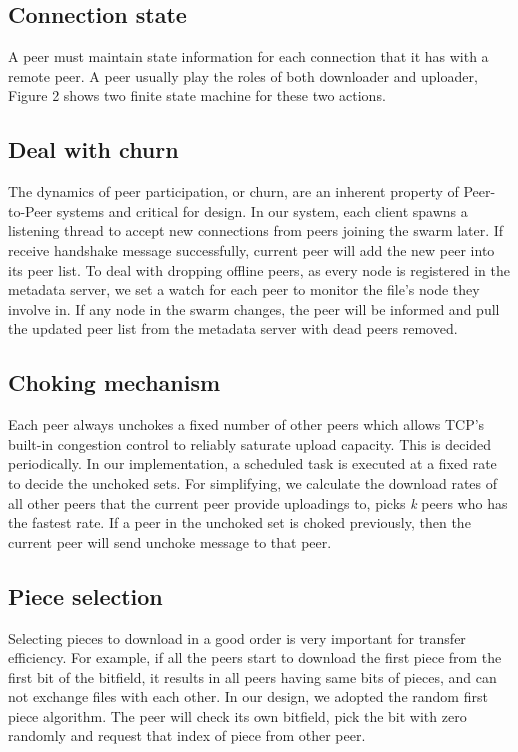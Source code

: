 \documentclass[conference]{IEEEtran}
\begin{document}
	\subsection{Connection state}
	A peer must maintain state information for each connection that it has with a remote peer. A peer usually play the roles of both downloader and uploader, Figure 2 shows two finite state machine for these two actions.
	
	\subsection{Deal with churn}
	The dynamics of peer participation, or churn, are an inherent property of Peer-to-Peer  systems and critical for design. In our system, each client spawns a listening thread to accept new connections from peers joining the swarm later. If receive handshake message successfully, current peer will add the new peer into its peer list. To deal with dropping offline peers, as every node is registered in the metadata server, we set a watch for each peer to monitor the file's node they involve in. If any node in the swarm changes, the peer will be informed and pull the updated peer list from the metadata server with dead peers removed.
	
	\subsection{Choking mechanism}
	Each peer always unchokes a fixed number of other peers which allows TCP’s built-in congestion control to reliably saturate upload capacity\cite{Cohen}. This is decided periodically. In our implementation, a scheduled task is executed at a fixed rate to decide the unchoked sets. For simplifying, we calculate the download rates of all other peers that the current peer provide uploadings to, picks \emph{k} peers who has the fastest rate. If a peer in the unchoked set is choked previously, then the current peer will send unchoke message to that peer.
	
	\subsection{Piece selection}
	Selecting pieces to download in a good order is very important for transfer efficiency. For example, if all the peers start to download the first piece from the first bit of the bitfield, it results in all peers having same bits of pieces, and can not exchange files with each other. In our design, we adopted the random first piece algorithm. The peer will check its own bitfield, pick the bit with zero randomly and request that index of piece from other peer.
	
\end{document}
